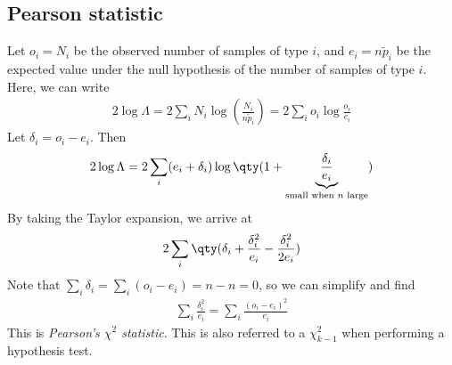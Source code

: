 \subsection{Pearson statistic}
Let $o_i = N_i$ be the observed number of samples of type $i$, and $e_i = n \widetilde p_i$ be the expected value under the null hypothesis of the number of samples of type $i$.
Here, we can write
\begin{align*}
	2 \log \Lambda = 2 \sum_i N_i \log(\frac{N_i}{n \widetilde p_i}) = 2 \sum_i o_i \log \frac{o_i}{e_i}
\end{align*}
Let $\delta_i = o_i - e_i$.
Then
\begin{align*}
	2 \log \Lambda = 2 \sum_i (e_i + \delta_i) \log\qty(1 + \underbrace{\frac{\delta_i}{e_i}}_{\text{small when } n \text{ large}})
\end{align*}
By taking the Taylor expansion, we arrive at
\begin{align*}
	2 \sum_i \qty(\delta_i + \frac{\delta_i^2}{e_i} - \frac{\delta_i^2}{2e_i})
\end{align*}
Note that $\sum_i \delta_i = \sum_i (o_i - e_i) = n - n = 0$, so we can simplify and find
\begin{align*}
	\sum_i \frac{\delta_i^2}{e_i} = \sum_i \frac{(o_i - e_i)^2}{e_i}
\end{align*}
This is \textit{Pearson's $\chi^2$ statistic}.
This is also referred to a $\chi^2_{k-1}$ when performing a hypothesis test.

